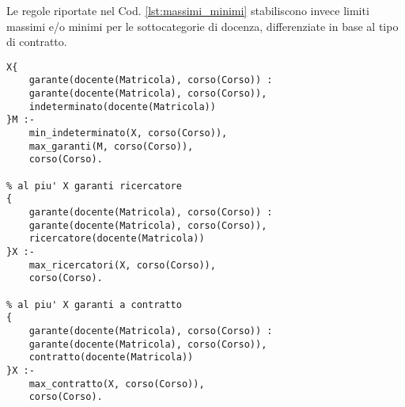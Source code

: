 Le regole riportate nel Cod. \ref{lst:massimi_minimi} stabiliscono invece limiti
massimi e/o minimi per le sottocategorie di docenza, differenziate in base al
tipo di contratto.
\begin{lstlisting}[style=asp, caption={Frammento del file
\texttt{main.lp}.}, label={lst:massimi_minimi}]
% almeno X garanti a tempo indeterminato
X{
	garante(docente(Matricola), corso(Corso)) :
	garante(docente(Matricola), corso(Corso)),
	indeterminato(docente(Matricola))
}M :-
	min_indeterminato(X, corso(Corso)),
	max_garanti(M, corso(Corso)),
	corso(Corso).

% al piu' X garanti ricercatore
{
	garante(docente(Matricola), corso(Corso)) :
	garante(docente(Matricola), corso(Corso)),
	ricercatore(docente(Matricola))
}X :-
	max_ricercatori(X, corso(Corso)),
	corso(Corso).

% al piu' X garanti a contratto
{
	garante(docente(Matricola), corso(Corso)) :
	garante(docente(Matricola), corso(Corso)),
	contratto(docente(Matricola))
}X :-
	max_contratto(X, corso(Corso)),
	corso(Corso).
\end{lstlisting}
